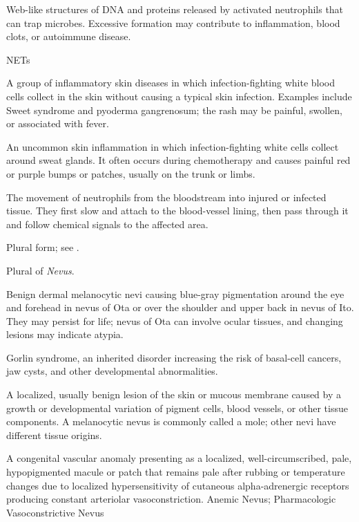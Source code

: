  Web-like structures of DNA and proteins released by activated neutrophils that can trap microbes. Excessive formation may contribute to inflammation, blood clots, or autoimmune disease.

\synonyms
NETs

 A group of inflammatory skin diseases in which infection-fighting white blood cells collect in the skin without causing a typical skin infection. Examples include Sweet syndrome and pyoderma gangrenosum; the rash may be painful, swollen, or associated with fever.

 An uncommon skin inflammation in which infection-fighting white cells collect around sweat glands. It often occurs during chemotherapy and causes painful red or purple bumps or patches, usually on the trunk or limbs.

 The movement of neutrophils from the bloodstream into injured or infected tissue. They first slow and attach to the blood-vessel lining, then pass through it and follow chemical signals to the affected area.

 Plural form; see .

 Plural of \textit{Nevus}.

 Benign dermal melanocytic nevi causing blue-gray pigmentation around the eye and forehead in nevus of Ota or over the shoulder and upper back in nevus of Ito. They may persist for life; nevus of Ota can involve ocular tissues, and changing lesions may indicate atypia.

 Gorlin syndrome, an inherited disorder increasing the risk of basal-cell cancers, jaw cysts, and other developmental abnormalities.

 A localized, usually benign lesion of the skin or mucous membrane caused by a growth or developmental variation of pigment cells, blood vessels, or other tissue components. A melanocytic nevus is commonly called a mole; other nevi have different tissue origins.

 A congenital vascular anomaly presenting as a localized, well-circumscribed, pale, hypopigmented macule or patch that remains pale after rubbing or temperature changes due to localized hypersensitivity of cutaneous alpha-adrenergic receptors producing constant arteriolar vasoconstriction.
\synonyms
Anemic Nevus; Pharmacologic Vasoconstrictive Nevus

